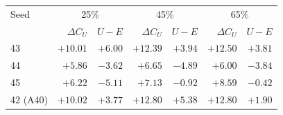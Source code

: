 \begin{tabular}{lrrrrrr}
\toprule
Seed & \multicolumn{2}{c}{25\%} & \multicolumn{2}{c}{45\%} & \multicolumn{2}{c}{65\%} \\
 & $\Delta C_U$ & $U-E$ & $\Delta C_U$ & $U-E$ & $\Delta C_U$ & $U-E$ \\
\midrule
43 & ${+}10.01$ & ${+}6.00$ & ${+}12.39$ & ${+}3.94$ & ${+}12.50$ & ${+}3.81$ \\
44 & ${+}5.86$ & $-3.62$ & ${+}6.65$ & $-4.89$ & ${+}6.00$ & $-3.84$ \\
45 & ${+}6.22$ & $-5.11$ & ${+}7.13$ & $-0.92$ & ${+}8.59$ & $-0.42$ \\
42 (A40) & ${+}10.02$ & ${+}3.77$ & ${+}12.80$ & ${+}5.38$ & ${+}12.80$ & ${+}1.90$ \\
\bottomrule
\end{tabular}
